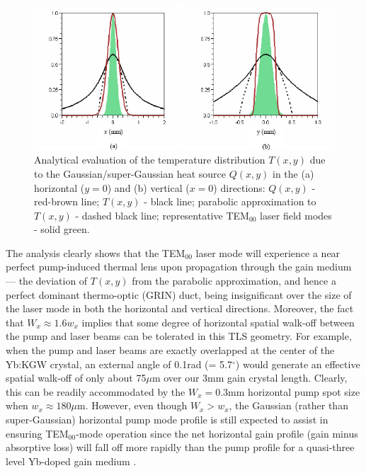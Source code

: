 \begin{figure}
  \centering
  \includegraphics{thermal.jpg}
  \caption[Thermal profile and thermal lens shaping of KGW crystal pumping]{
    Analytical evaluation of the temperature distribution $T(x,y)$ due to the Gaussian/super-Gaussian heat source $Q(x,y)$ in the (a) horizontal ($y=0$) and (b) vertical ($x=0$) directions: $Q(x,y)$ - red-brown line; $T(x,y)$ - black line; parabolic approximation to $T(x,y)$ - dashed black line; representative TEM$_{00}$ laser field modes - solid green.
  }
  \label{fig:laser-thermal}
\end{figure}

The analysis clearly shows that the TEM$_{00}$ laser mode will experience a near perfect pump-induced thermal lens upon propagation through the gain medium --- the deviation of $T(x,y)$ from the parabolic approximation, and hence a perfect dominant thermo-optic (GRIN) duct, being insignificant over the size of the laser mode in both the horizontal and vertical directions.
Moreover, the fact that $W_x \approx 1.6 w_x$ implies that some degree of horizontal spatial walk-off between the pump and laser beams can be tolerated in this TLS geometry.
For example, when the pump and laser beams are exactly overlapped at the center of the Yb:KGW crystal, an external angle of 0.1rad (= 5.7$^\circ$) would generate an effective spatial walk-off of only about 75$\mu$m over our 3mm gain crystal length.
Clearly, this can be readily accommodated by the $W_x = 0.3$mm horizontal pump spot size when $w_x \approx 180\mu$m.
However, even though $W_x > w_x$, the Gaussian (rather than super-Gaussian) horizontal pump mode profile is still expected to assist in ensuring TEM$_{00}$-mode operation since the net horizontal gain profile (gain minus absorptive loss) will fall off more rapidly than the pump profile for a quasi-three level Yb-doped gain medium \cite{Brenier_new_criteria}.

